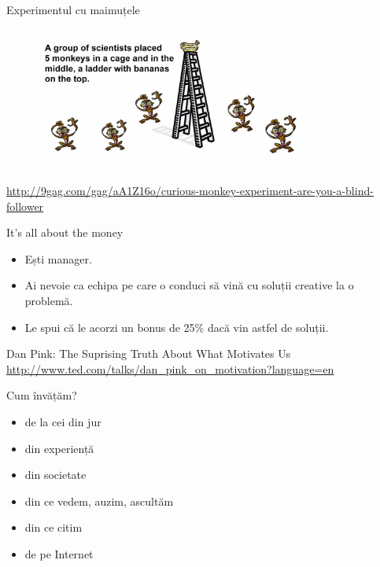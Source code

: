\documentclass{simple}
\begin{document}
\begin{frame}{Experimentul cu maimuțele}
  \begin{figure}
    \centering
    \includegraphics[width=0.8\textwidth]{img/monkey-experiment}
  \end{figure}
  \begin{center}
    \tiny
    \url{http://9gag.com/gag/aA1Z16o/curious-monkey-experiment-are-you-a-blind-follower}
  \end{center}
\end{frame}

\begin{frame}{It's all about the money}
  \begin{itemize}
    \pause \item Ești manager.
    \pause \item Ai nevoie ca echipa pe care o conduci să vină cu soluții creative la o problemă.
    \pause \item Le spui că le acorzi un bonus de 25\% dacă vin astfel de soluții.
  \end{itemize}
  \pause
  \begin{center}
    Dan Pink: The Suprising Truth About What Motivates Us\\
    \vspace{3mm}
    \scriptsize
    \url{http://www.ted.com/talks/dan_pink_on_motivation?language=en}
  \end{center}
\end{frame}

\begin{frame}{Cum învățăm?}
  \begin{itemize}
    \pause \item de la cei din jur
    \pause \item din experiență
    \pause \item din societate
    \pause \item din ce vedem, auzim, ascultăm
    \pause \item din ce citim
    \pause \item de pe Internet
  \end{itemize}
\end{frame}
\end{document}
